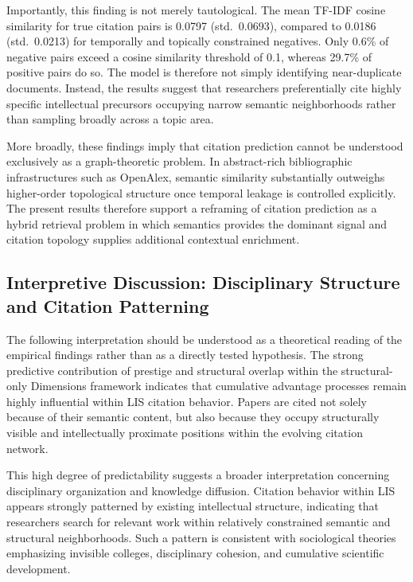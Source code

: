 \documentclass[11pt,a4paper]{article}
\begin{document}
Importantly, this finding is not merely tautological. The mean TF-IDF cosine similarity for true citation pairs is 0.0797 (std.~0.0693), compared to 0.0186 (std.~0.0213) for temporally and topically constrained negatives. Only 0.6\% of negative pairs exceed a cosine similarity threshold of 0.1, whereas 29.7\% of positive pairs do so. The model is therefore not simply identifying near-duplicate documents. Instead, the results suggest that researchers preferentially cite highly specific intellectual precursors occupying narrow semantic neighborhoods rather than sampling broadly across a topic area.

More broadly, these findings imply that citation prediction cannot be understood exclusively as a graph-theoretic problem. In abstract-rich bibliographic infrastructures such as OpenAlex, semantic similarity substantially outweighs higher-order topological structure once temporal leakage is controlled explicitly. The present results therefore support a reframing of citation prediction as a hybrid retrieval problem in which semantics provides the dominant signal and citation topology supplies additional contextual enrichment.

\subsection{Interpretive Discussion: Disciplinary Structure and Citation Patterning}

The following interpretation should be understood as a theoretical reading of the empirical findings rather than as a directly tested hypothesis. The strong predictive contribution of prestige and structural overlap within the structural-only Dimensions framework indicates that cumulative advantage processes remain highly influential within LIS citation behavior. Papers are cited not solely because of their semantic content, but also because they occupy structurally visible and intellectually proximate positions within the evolving citation network.

This high degree of predictability suggests a broader interpretation concerning disciplinary organization and knowledge diffusion. Citation behavior within LIS appears strongly patterned by existing intellectual structure, indicating that researchers search for relevant work within relatively constrained semantic and structural neighborhoods. Such a pattern is consistent with sociological theories emphasizing invisible colleges, disciplinary cohesion, and cumulative scientific development.
\end{document}
